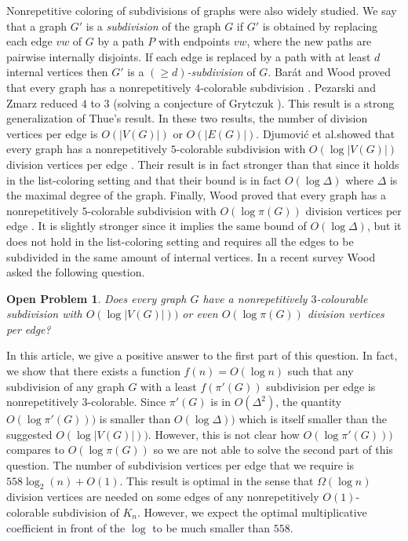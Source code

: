 \documentclass[a4paper,12pt]{article}
\newtheorem{question}{Open Problem}
\begin{document}
Nonrepetitive coloring of subdivisions of graphs were also widely studied. 
We say that a graph $G'$ is a \emph{subdivision} of the graph $G$ if $G'$ is obtained by replacing each edge $vw$ of $G$ by a path $P$ with endpoints $vw$, where the new paths are pairwise internally disjoints.
If each edge is replaced by a path with at least $d$ internal vertices then $G'$ is a \emph{$(\ge d)$-subdivision} of $G$.
 Barát and Wood proved that every graph has a nonrepetitively $4$-colorable subdivision \cite{3subdivision4colors}. 
 Pezarski and Zmarz reduced $4$ to $3$ \cite{3subdivision} (solving a conjecture of Grytczuk \cite{Grytczuksubdivisionsurvey}). This result is a strong generalization of Thue's result. 
 In these two results, the number of division vertices per edge is $O(|V(G)|)$ or $O(|E(G)|)$.
 Djumovi\'c et al.showed that every graph has a nonrepetitively $5$-colorable subdivision with $O(\log|V(G)|)$ division vertices per edge \cite{Dujmovic2016}. Their result is in fact stronger than that since it holds in the list-coloring setting and that their bound is in fact $O(\log \Delta)$ where $\Delta$ is the maximal degree of the graph. 
 Finally, Wood proved that every graph has a nonrepetitively $5$-colorable subdivision with $O(\log \pi(G))$ division vertices per edge \cite{woodSurvey}.
It is slightly stronger since it implies the same bound of $O(\log \Delta)$, but it does not hold in the list-coloring setting and requires all the edges to be subdivided in the same amount of internal vertices. 
In a recent survey Wood asked the following question.
 \begin{question}{\cite[Open Question 6.21]{woodSurvey}}
   Does every graph $G$ have a nonrepetitively $3$-colourable subdivision
 with $O(\log|V(G)|))$ or even $O(\log\pi(G))$ division vertices per edge?
 \end{question}
 
 In this article, we give a positive answer to the first part of this question. In fact, we show that there exists a function $f(n)=O(\log n)$ such that any subdivision of any graph $G$ with a least $f(\pi'(G))$ subdivision per edge is nonrepetitively $3$-colorable. 
Since $\pi'(G)$ is in $O(\Delta^2)$, the quantity $O(\log \pi'(G)))$ is smaller than $O(\log \Delta))$ which is itself smaller than the suggested $O(\log|V(G)|))$. However, this is not clear how $O(\log \pi'(G)))$ compares to $O(\log\pi(G))$ so we are not able to solve the second part of this question. The number of subdivision vertices per edge that we require is  $558 \log_2(n)+ O(1)$. 
This result is optimal in the sense that $\Omega(\log n)$ division vertices are needed  on some edges of any nonrepetitively $O(1)$-colorable subdivision of $K_n$\cite{nesetrilsubdivision}. However, we expect the optimal multiplicative coefficient in front of the $\log$ to be much smaller than $558$.
 
\end{document}
